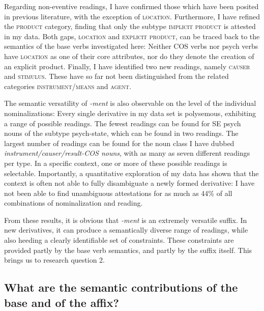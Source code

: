 Regarding non-eventive readings, I have confirmed those which have been posited in previous literature, with the exception of \textsc{location}. 
Furthermore, I have refined the \textsc{product} category, finding that only the subtype \textsc{implicit product} is attested in my data. 
Both gaps, \textsc{location} and \textsc{explicit product}, can be traced back to the semantics of the base verbs investigated here: Neither COS verbs nor psych verbs have \textsc{location} as one of their core attributes, nor do they denote the creation of an explicit product. 
Finally, I have identified two new readings, namely \textsc{causer} and \textsc{stimulus}. These have so far not been distinguished from the related categories \textsc{instrument/means} and \textsc{agent}.

The semantic versatility of \textit{-ment} is also observable on the level of the individual nominalizations: Every single derivative in my data set is polysemous, exhibiting a range of possible readings. 
The fewest readings can be found for SE psych nouns of the subtype psych-state, which can be found in two readings. The largest number of readings can be found for the noun class I have dubbed \textit{instrument/causer/result-COS nouns}, with as many as seven different readings per type. In a specific context, one or more of these possible readings is selectable. Importantly, a quantitative exploration of my data has shown that the context is often not able to fully disambiguate a newly formed derivative: I have not been able to find unambiguous attestations for as much as 44\% of all combinations of nominalization and reading. 

From these results, it is obvious that \textit{-ment} is an extremely versatile suffix. In new derivatives, it can produce a semantically diverse range of readings, while also heeding a clearly identifiable set of constraints. These constraints are provided partly by the base verb semantics, and partly by the suffix itself. This brings us to research question 2.

\subsection{What are the semantic contributions of the base and of the affix?}

